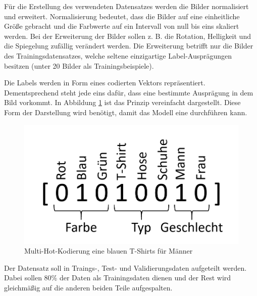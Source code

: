 Für die Erstellung des verwendeten Datensatzes werden die Bilder normalisiert und erweitert. Normalisierung bedeutet, dass die Bilder auf eine einheitliche Größe gebracht und die Farbwerte auf ein Intervall von null bis eins skaliert werden. Bei der Erweiterung der Bilder sollen z. B. die Rotation, Helligkeit und die Spiegelung zufällig verändert werden. Die Erweiterung betrifft nur die Bilder des Trainingsdatensatzes, welche seltene einzigartige Label-Ausprägungen besitzen (unter 20 Bilder als Trainingsbeispiele).

Die Labels werden in Form eines  codierten Vektors repräsentiert. Dementsprechend steht jede eins dafür, dass eine bestimmte Ausprägung in dem Bild vorkommt. In Abbildung \ref{fig:multihot} ist das Prinzip vereinfacht dargestellt. Diese Form der Darstellung wird benötigt, damit das Modell eine  durchführen kann.

\begin{figure}[H]
	\centering
	\includegraphics[width=0.3\linewidth]{images/MultiHotEncoding.png}
	\caption{Multi-Hot-Kodierung eine blauen T-Shirts für Männer}
	\label{fig:multihot}
\end{figure}

Der Datensatz soll in Traings-, Test- und Validierungsdaten aufgeteilt werden. Dabei sollen 80\% der Daten als Trainingsdaten dienen und der Rest wird gleichmäßig auf die anderen beiden Teile aufgespalten.
